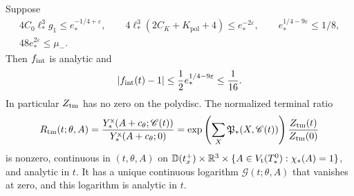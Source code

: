 \begin{proposition}\label{prop:interacting-factor}
Suppose
\begin{gather}
 4C_0\ell_*^3g_1\le e_*^{-1/4+\varepsilon},\qquad
 4\ell_*^3(2C_K+K_{\mathrm{pol}}+4)\le e_*^{-2\varepsilon},\qquad
 e_*^{1/4-9\varepsilon}\le1/8,
                                      \label{eq:interacting-factor-conditions}\\
 48e_*^{2\varepsilon}\le\mu_- .
                                      \label{eq:interacting-small-complex-mass}
\end{gather}
Then $f_{\rm int}$ is analytic and
\begin{equation}\label{eq:interacting-factor-bound}
 |f_{\rm int}(t)-1|\le\frac12e_*^{1/4-9\varepsilon}
                              \le\frac1{16}.
\end{equation}
In particular $Z_{\rm tm}$ has no zero on the
polydisc. The normalized terminal ratio
\begin{equation}\label{eq:interacting-terminal-ratio}
 R_{\rm tm}(t;\theta,A)=
 \frac{Y_*^{\rm x}(A+c_\theta;\mathscr C(t))}
      {Y_*^{\rm x}(A+c_\theta;0)}
 =\exp\left(\sum_X\mathfrak P_*(X,\mathscr C(t))\right)
       \frac{Z_{\rm tm}(t)}{Z_{\rm tm}(0)}
\end{equation}
is nonzero, continuous in $(t,\theta,A)$ on
$\mathbb D(t_x^+)\times\mathbb R^3\times\{A\in V_{\mathrm t}(T_*^0):\chi_*(A)=1\}$,
and analytic in $t$. It has a unique continuous
logarithm $\mathcal G(t;\theta,A)$ that vanishes
at zero, and this logarithm is analytic in $t$.
\end{proposition}

